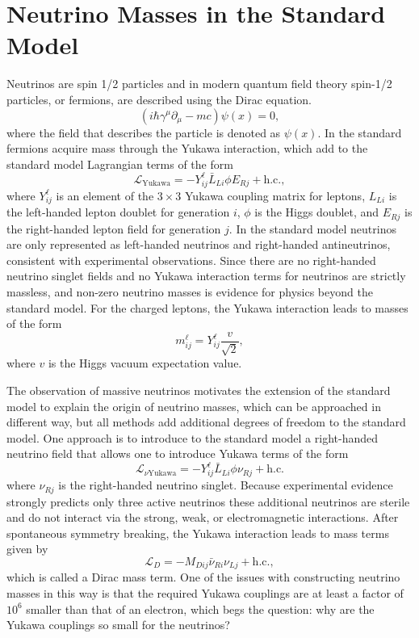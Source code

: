 \section{Neutrino Masses in the Standard Model}

Neutrinos are spin 1/2 particles and in modern quantum field theory spin-1/2 particles, or fermions, are described using the Dirac equation. 
\begin{equation}
    (i\hbar\gamma^\mu\partial_\mu-mc)\psi(x)=0, 
\end{equation}
where the field that describes the particle is denoted as $\psi(x)$. In the standard fermions acquire mass through the Yukawa interaction, which add to the standard model Lagrangian terms of the form 
\begin{equation}
    \mathcal{L}_\textrm{Yukawa}=-Y^\ell_{ij}\bar{L}_{Li}\phi E_{Rj}+\textrm{h.c.},
\end{equation}
where $Y_{ij}^\ell$ is an element of the $3\times3$ Yukawa coupling matrix for leptons, $L_{Li}$ is the left-handed lepton doublet for generation $i$, $\phi$ is the Higgs doublet, and $E_{Rj}$ is the right-handed lepton field for generation $j$. In the standard model neutrinos are only represented as left-handed neutrinos and right-handed antineutrinos, consistent with experimental observations. Since there are no right-handed neutrino singlet fields and no Yukawa interaction terms for neutrinos are strictly massless, and non-zero neutrino masses is evidence for physics beyond the standard model. For the charged leptons, the Yukawa interaction leads to masses of the form 
\begin{equation}
    m^\ell_{ij}=Y^\ell_{ij}\frac{v}{\sqrt{2}},
\end{equation}
where $v$ is the Higgs vacuum expectation value.

The observation of massive neutrinos motivates the extension of the standard model to explain the origin of neutrino masses, which can be approached in different way, but all methods add additional degrees of freedom to the standard model. One approach is to introduce to the standard model a right-handed neutrino field that allows one to introduce Yukawa terms of the form 
\begin{equation}
    \mathcal{L}_{\nu\textrm{Yukawa}} = -Y^\ell_{ij}\bar{L}_{Li}\phi \nu_{Rj}+\textrm{h.c.}
\end{equation}
where $\nu_{Rj}$ is the right-handed neutrino singlet. Because experimental evidence strongly predicts only three active neutrinos these additional neutrinos are sterile and do not interact via the strong, weak, or electromagnetic interactions. After spontaneous symmetry breaking, the Yukawa interaction leads to mass terms given by 
\begin{equation}
    \mathcal{L}_{D}=-M_{Dij}\bar{\nu}_{Ri}\nu_{Lj} +\textrm{h.c.},
\end{equation}
which is called a Dirac mass term. One of the issues with constructing neutrino masses in this way is that the required Yukawa couplings are at least a factor of $10^6$ smaller than that of an electron, which begs the question: why are the Yukawa couplings so small for the neutrinos?

